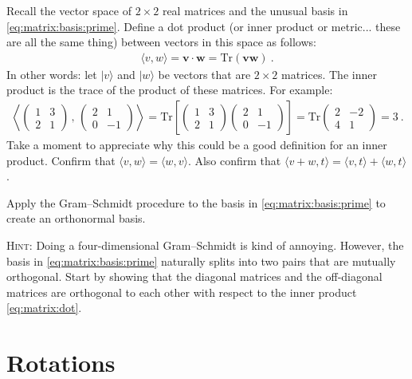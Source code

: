 \documentclass[12pt]{article}
\numberwithin{equation}{section}    %
\renewcommand{\vec}[1]{\mathbf{#1}} %
\begin{document}
Recall the vector space of $2\times 2$ real matrices and the unusual basis in \eqref{eq:matrix:basis:prime}. Define a dot product (or inner product or metric... these are all the same thing) between vectors in this space as follows:
\begin{align}
	\langle v,w\rangle = \vec{v}\cdot \vec{w} = \text{Tr}(\vec v \vec w) \ .
	\label{eq:matrix:dot}
\end{align}
In other words: let $|v\rangle$ and $|w\rangle$ be vectors that are $2\times 2$ matrices. The inner product is the trace of the product of these matrices. For example:
\begin{align}
	\left\langle
	\begin{pmatrix}
		1 & 3\\
		2 & 1
	\end{pmatrix}
	\, , \, 
	\begin{pmatrix}
		2 & 1\\
		0 & -1
	\end{pmatrix}
	\right\rangle
	= 
	\text{Tr}\left[\begin{pmatrix}
		1 & 3\\
		2 & 1
	\end{pmatrix}
	\begin{pmatrix}
		2 & 1\\
		0 & -1
	\end{pmatrix}\right]
	=
	\text{Tr}
	\begin{pmatrix}
		2 & -2 \\ 4 & 1
	\end{pmatrix}
	= 
	3 \ .
\end{align}
Take a moment to appreciate why this could be a good definition for an inner product. Confirm that $\langle v,w\rangle = \langle w,v\rangle$. Also confirm that $\langle v+w, t\rangle = \langle v,t\rangle + \langle w, t\rangle$. 

Apply the Gram--Schmidt procedure to the basis in \eqref{eq:matrix:basis:prime} to create an orthonormal basis.

\textsc{Hint:} Doing a four-dimensional Gram--Schmidt is kind of annoying. However, the basis in \eqref{eq:matrix:basis:prime} naturally splits into two pairs that are mutually orthogonal. Start by showing that the diagonal matrices and the off-diagonal matrices are orthogonal to each other with respect to the inner product \eqref{eq:matrix:dot}.






\section{Rotations}
\end{document}
